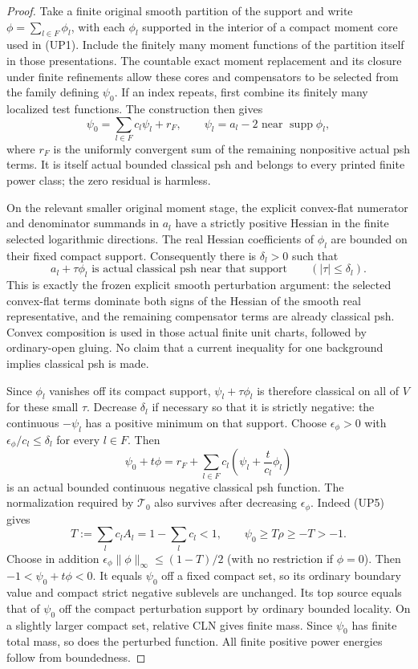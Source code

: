 \documentclass[11pt,a4paper]{article}
\numberwithin{equation}{section}
\theoremstyle{definition}
\theoremstyle{remark}
\begin{document}
\begin{proof}
Take a finite original smooth partition of the support and
write $\phi=\sum_{l\in F}\phi_l$, with each $\phi_l$
supported in the interior of a compact moment core used
in \textup{(UP1)}.  Include the finitely many moment
functions of the partition itself in those presentations.
The countable exact moment replacement and its closure under
finite refinements allow these cores and compensators to
be selected from the family defining $\psi_0$.
If an index repeats, first combine its finitely many
localized test functions.  The construction then gives
\[
 \psi_0=\sum_{l\in F}c_l\psi_l+r_F,
 \qquad \psi_l=a_l-2\text{ near }\operatorname{supp}\phi_l,
 \tag{NP3}
\]
where $r_F$ is the uniformly convergent sum of the remaining
nonpositive actual psh terms.  It is itself actual bounded
classical psh and belongs to every printed finite power class;
the zero residual is harmless.

On the relevant smaller original moment stage, the explicit
convex-flat numerator and denominator summands in $a_l$
have a strictly positive Hessian in the finite selected
logarithmic directions.  The real Hessian coefficients of
$\phi_l$ are bounded on their fixed compact support.
Consequently there is $\delta_l>0$ such that
\[
                     a_l+\tau\phi_l
             \text{ is actual classical psh near that support}
                  \qquad(|\tau|\le\delta_l).
 \tag{NP4}
\]
This is exactly the frozen explicit smooth perturbation
argument: the selected convex-flat terms dominate both
signs of the Hessian of the smooth real representative,
and the remaining compensator terms are already classical
psh.  Convex composition is used in those actual finite
unit charts, followed by ordinary-open gluing.  No claim
that a current inequality for one background implies
classical psh is made.

Since $\phi_l$ vanishes off its compact support,
$\psi_l+\tau\phi_l$ is therefore classical on all of
$V$ for these small $\tau$.  Decrease $\delta_l$ if
necessary so that it is strictly negative: the continuous
$-\psi_l$ has a positive minimum on that support.
Choose $\epsilon_\phi>0$ with
$\epsilon_\phi/c_l\le\delta_l$ for every $l\in F$.
Then
\[
     \psi_0+t\phi
       =r_F+\sum_{l\in F}c_l
                    \left(\psi_l+\frac{t}{c_l}\phi_l\right)
 \tag{NP5}
\]
is an actual bounded continuous negative classical psh
function.  The normalization required by $\mathscr T_0$
also survives after decreasing $\epsilon_\phi$.
Indeed \textup{(UP5)} gives
\[
 T:=\sum_l c_lA_l=1-\sum_lc_l<1,
       \qquad\psi_0\ge T\rho\ge-T>-1.
\]
Choose in addition
$\epsilon_\phi\|\phi\|_\infty\le(1-T)/2$
(with no restriction if $\phi=0$).  Then
$-1<\psi_0+t\phi<0$.  It equals $\psi_0$ off a fixed compact set,
so its ordinary boundary value and compact strict negative
sublevels are unchanged.  Its top source equals that of
$\psi_0$ off the compact perturbation support by ordinary
bounded locality.  On a slightly larger compact set,
relative CLN gives finite mass.  Since $\psi_0$ has
finite total mass, so does the perturbed function.  All
finite positive power energies follow from boundedness.


\end{proof}
\end{document}
